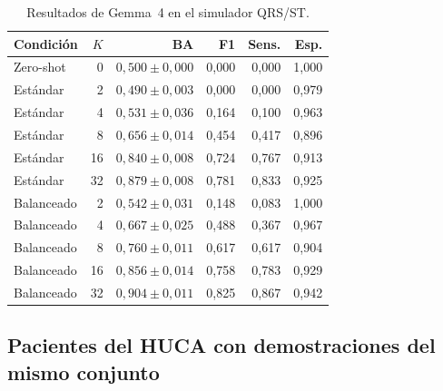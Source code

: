 \begin{table}[H]
  \centering
  \small
  \begin{tabular}{lrrrrr}
    \toprule
    Condición & \(K\) & BA & F1 & Sens. & Esp. \\
    \midrule
    Zero-shot & 0 & \(0,500 \pm 0,000\) & 0,000 & 0,000 & 1,000 \\
    Estándar & 2 & \(0,490 \pm 0,003\) & 0,000 & 0,000 & 0,979 \\
    Estándar & 4 & \(0,531 \pm 0,036\) & 0,164 & 0,100 & 0,963 \\
    Estándar & 8 & \(0,656 \pm 0,014\) & 0,454 & 0,417 & 0,896 \\
    Estándar & 16 & \(0,840 \pm 0,008\) & 0,724 & 0,767 & 0,913 \\
    Estándar & 32 & \(0,879 \pm 0,008\) & 0,781 & 0,833 & 0,925 \\
    Balanceado & 2 & \(0,542 \pm 0,031\) & 0,148 & 0,083 & 1,000 \\
    Balanceado & 4 & \(0,667 \pm 0,025\) & 0,488 & 0,367 & 0,967 \\
    Balanceado & 8 & \(0,760 \pm 0,011\) & 0,617 & 0,617 & 0,904 \\
    Balanceado & 16 & \(0,856 \pm 0,014\) & 0,758 & 0,783 & 0,929 \\
    Balanceado & 32 & \(0,904 \pm 0,011\) & 0,825 & 0,867 & 0,942 \\
    \bottomrule
  \end{tabular}
  \caption{Resultados de Gemma~4 en el simulador QRS/ST.}
  \label{tab:app_vlm_simulador}
  \resultstablenote
\end{table}

\subsection{Pacientes del HUCA con demostraciones del mismo conjunto}

